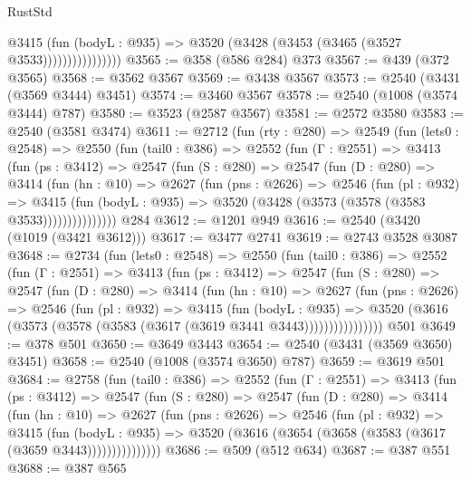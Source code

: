 \begin{lexlean}{RustStd}
\begin{coremodule}
                        @3415
                          (fun (bodyL : @935) =>
                          @3520 (@3428 (@3453 (@3465 (@3527 @3533))))))))))))))))
@3565 := @358 (@586 @284) @373
@3567 := @439 (@372 @3565)
@3568 := @3562 @3567
@3569 := @3438 @3567
@3573 := @2540 (@3431 (@3569 @3444) @3451)
@3574 := @3460 @3567
@3578 := @2540 (@1008 (@3574 @3444) @787)
@3580 := @3523 (@2587 @3567)
@3581 := @2572 @3580
@3583 := @2540 (@3581 @3474)
@3611 := @2712
    (fun (rty : @280) =>
    @2549
      (fun (lets0 : @2548) =>
      @2550
        (fun (tail0 : @386) =>
        @2552
          (fun (Γ : @2551) =>
          @3413
            (fun (ps : @3412) =>
            @2547
              (fun (S : @280) =>
              @2547
                (fun (D : @280) =>
                @3414
                  (fun (hn : @10) =>
                  @2627
                    (fun (pns : @2626) =>
                    @2546
                      (fun (pl : @932) =>
                      @3415
                        (fun (bodyL : @935) =>
                        @3520 (@3428 (@3573 (@3578 (@3583 @3533)))))))))))))))
    @284
@3612 := @1201 @949
@3616 := @2540 (@3420 (@1019 (@3421 @3612)))
@3617 := @3477 @2741
@3619 := @2743 @3528 @3087
@3648 := @2734
    (fun (lets0 : @2548) =>
    @2550
      (fun (tail0 : @386) =>
      @2552
        (fun (Γ : @2551) =>
        @3413
          (fun (ps : @3412) =>
          @2547
            (fun (S : @280) =>
            @2547
              (fun (D : @280) =>
              @3414
                (fun (hn : @10) =>
                @2627
                  (fun (pns : @2626) =>
                  @2546
                    (fun (pl : @932) =>
                    @3415
                      (fun (bodyL : @935) =>
                      @3520 (@3616 (@3573 (@3578 (@3583 (@3617 (@3619 @3441 @3443))))))))))))))))
    @501
@3649 := @378 @501
@3650 := @3649 @3443
@3654 := @2540 (@3431 (@3569 @3650) @3451)
@3658 := @2540 (@1008 (@3574 @3650) @787)
@3659 := @3619 @501
@3684 := @2758
    (fun (tail0 : @386) =>
    @2552
      (fun (Γ : @2551) =>
      @3413
        (fun (ps : @3412) =>
        @2547
          (fun (S : @280) =>
          @2547
            (fun (D : @280) =>
            @3414
              (fun (hn : @10) =>
              @2627
                (fun (pns : @2626) =>
                @2546
                  (fun (pl : @932) =>
                  @3415
                    (fun (bodyL : @935) =>
                    @3520 (@3616 (@3654 (@3658 (@3583 (@3617 (@3659 @3443)))))))))))))))
@3686 := @509 (@512 @634)
@3687 := @387 @551
@3688 := @387 @565

\end{coremodule}
\end{lexlean}
